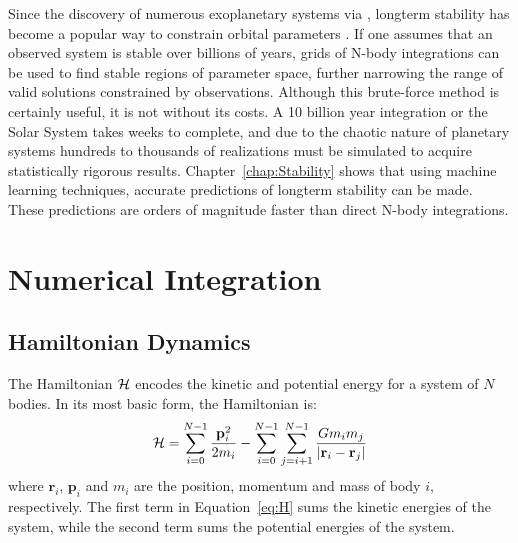 Since the discovery of numerous exoplanetary systems via \kep, longterm stability has become a popular way to constrain orbital parameters \citep{Lissauer2011, Steffen2013, Jontof-Hutter2014, Tamayo2015}. 
If one assumes that an observed system is stable over billions of years, grids of N-body integrations can be used to find stable regions of parameter space, further narrowing the range of valid solutions constrained by observations. 
Although this brute-force method is certainly useful, it is not without its costs. 
A 10 billion year integration or the Solar System takes weeks to complete, and due to the chaotic nature of planetary systems hundreds to thousands of realizations must be simulated to acquire statistically rigorous results. 
Chapter~\ref{chap:Stability} shows that using machine learning techniques, accurate predictions of longterm stability can be made. 
These predictions are orders of magnitude faster than direct N-body integrations. 

\section{Numerical Integration}
\subsection{Hamiltonian Dynamics}
The Hamiltonian $\mathcal{H}$ encodes the kinetic and potential energy for a system of $N$ bodies. 
In its most basic form, the Hamiltonian is:
\begin{equation}
\mathcal{H}  = \sum_{i=0}^{N-1} \frac{\textbf{p}_i^2}{2m_i} - \sum_{i=0}^{N-1} \sum_{j=i+1}^{N-1} \frac{Gm_im_j}{|\textbf{r}_i - \textbf{r}_j|}
\label{eq:H}
\end{equation}
where $\textbf{r}_i$, $\textbf{p}_i$ and $m_i$ are the position, momentum and mass of body $i$, respectively. 
The first term in Equation~\ref{eq:H} sums the kinetic energies of the system, while the second term sums the potential energies of the system.


